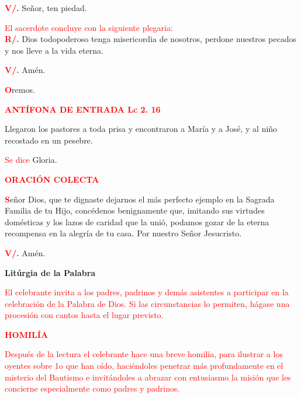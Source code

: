 \documentclass[12pt, letterpaper, spanish]{article}
\begin{document}
  \noindent
  {\bfseries \textcolor{red}{V/.}} \hspace{1cm} Se\~nor, ten piedad. 

  \large {\textcolor{red}{El sacerdote concluye con la siguiente plegaria:}}\\
  \Large {\bfseries \textcolor{red}{R/.}} \hspace{1cm} Dios todopoderoso tenga misericordia de nosotros, perdone nuestros pecados y nos lleve a la vida eterna.

  \noindent
  \Large {\bfseries \textcolor{red}{V/.}} \hspace{1cm} Am\'en.

  \noindent
  \lettrine[lines=1]{\bfseries \textcolor{red}{O}}{}\Large {remos.}

  \large {\bfseries \textcolor{red}{ANT\'IFONA DE ENTRADA \hspace{1cm} Lc 2. 16} }

  \noindent
  \Large {Llegaron los pastores a toda prisa y encontraron a Mar\'ia y a Jos\'e, y al ni\~no recostado en un pesebre.}

  \large {\textcolor{red}{Se dice} Gloria.}

  \large {\bfseries \textcolor{red}{ORACI\'ON COLECTA}}

  \lettrine[lines=2]{\bfseries \textcolor{red}{S}}{}\Large {e\~nor Dios, que te dignaste dejarnos el m\'as perfecto ejemplo en la Sagrada Familia de tu Hijo, conc\'edenos benignamente que, imitando sus virtudes dom\'esticas y los lazos de caridad que la uni\'o, podamos gozar de la eterna recompensa en la alegr\'ia de tu casa. Por nuestro Se\~nor Jesucristo.}

  \noindent
  \Large {\bfseries \textcolor{red}{V/.}} \hspace{1cm} Am\'en.

  \clearpage

  \begin{center}
    \Huge {\bfseries Lit\'urgia de la Palabra}
  \end{center}

  \large {\textcolor{red}{El celebrante invita a los padres, padrinos y dem\'as asistentes a participar en la celebraci\'on de la Palabra de Dios. Si las circunstancias lo permiten, h\'agase una procesi\'on con cantos hasta el lugar previsto.}} 

  \Large {\bfseries \textcolor{red}{HOMIL\'IA}} 

  \large {\textcolor{red}{Despu\'es de la lectura el celebrante hace una breve homil\'ia, para ilustrar a los oyentes sobre 1o que han o\'ido, haci\'endoles penetrar m\'as profundamente en el misterio del Bautismo e invit\'andoles a abrazar con entusiasmo la misi\'on que les concierne especialmente como padres y padrinos.}}
\end{document}
